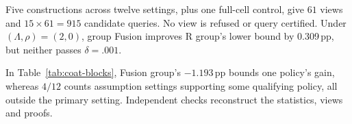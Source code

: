 Five constructions across twelve settings, plus one full-cell control, give $61$ views and $15\times61=915$ candidate queries. No view is refused or query certified. Under $(\Lambda,\rho)=(2,0)$, group Fusion improves R group's lower bound by 0.309\,pp, but neither passes $\delta=.001$.

In Table~\ref{tab:coat-blocks}, Fusion group's $-1.193$\,pp bounds one policy's gain, whereas $4/12$ counts assumption settings supporting some qualifying policy, all outside the primary setting. Independent checks reconstruct the statistics, views and proofs.

